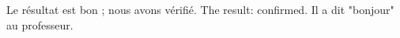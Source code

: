 \usepackage[french]{babel}
Le résultat est bon ; nous avons vérifié. The result: confirmed.
Il a dit "bonjour" au professeur.
